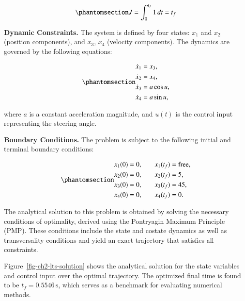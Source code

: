 \documentclass[
  number,
  preprint]{elsarticle}
\begin{document}
\begin{equation}\protect\phantomsection\label{eq-ch2-lts-obj}{
J = \int_0^{t_f} 1 \, dt = t_f
}\end{equation}

\textbf{Dynamic Constraints.} The system is defined by four states:
\(x_1\) and \(x_2\) (position components), and \(x_3\), \(x_4\)
(velocity components). The dynamics are governed by the following
equations:

\begin{equation}\protect\phantomsection\label{eq-ch2-lts-dynamics}{
\begin{aligned}
    \dot{x}_1 &= x_3, \\
    \dot{x}_2 &= x_4, \\
    \dot{x}_3 &= a \cos u, \\
    \dot{x}_4 &= a \sin u,
\end{aligned}
}\end{equation}

where \(a\) is a constant acceleration magnitude, and \(u(t)\) is the
control input representing the steering angle.

\textbf{Boundary Conditions.} The problem is subject to the following
initial and terminal boundary conditions:

\begin{equation}\protect\phantomsection\label{eq-ch2-lts-bc}{
\begin{aligned}
    x_1(0) &= 0, &\quad x_1(t_f) &= \text{free}, \\
    x_2(0) &= 0, &\quad x_2(t_f) &= 5, \\
    x_3(0) &= 0, &\quad x_3(t_f) &= 45, \\
    x_4(0) &= 0, &\quad x_4(t_f) &= 0.
\end{aligned}
}\end{equation}

The analytical solution to this problem is obtained by solving the
necessary conditions of optimality, derived using the Pontryagin Maximum
Principle (PMP). These conditions include the state and costate dynamics
as well as transversality conditions and yield an exact trajectory that
satisfies all constraints.

Figure~\ref{fig-ch2-lts-solution} shows the analytical solution for the
state variables and control input over the optimal trajectory. The
optimized final time is found to be \(t_f = 0.5546 \, \text{s}\), which
serves as a benchmark for evaluating numerical methods.
\end{document}
